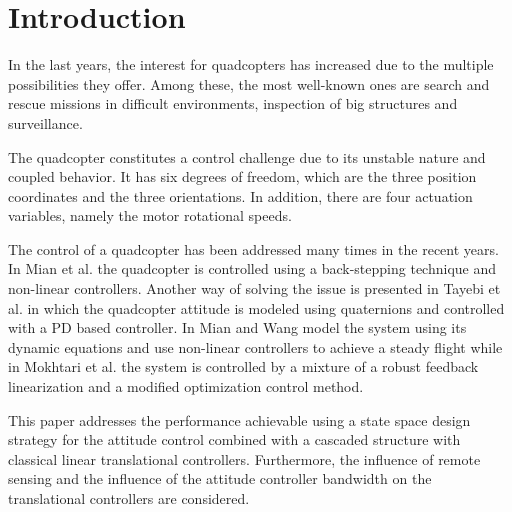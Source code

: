 \section{Introduction}
In the last years, the interest for quadcopters has increased due to the multiple possibilities they offer. Among these, the most well-known ones are search and rescue missions in difficult environments, inspection of big structures and surveillance. \nolinebreak\cite{droneuses}

The quadcopter constitutes a control challenge due to its unstable nature and coupled behavior. It has six degrees of freedom, which are the three position coordinates and the three orientations. In addition, there are four actuation variables, namely the motor rotational speeds. \cite{draganflyer}%

The control of a quadcopter has been addressed many times in the recent years. In Mian et al. \cite{backstepping} the quadcopter is controlled using a back-stepping technique and non-linear controllers. Another way of solving the issue is presented in Tayebi et al. \cite{quaternionsPD} in which the quadcopter attitude is modeled using quaternions and controlled with a PD based controller. In \cite{MianWang} Mian and Wang model the system using its dynamic equations and use non-linear controllers to achieve a steady flight while in Mokhtari et al. \cite{GHinf} the system is controlled by a mixture of a robust feedback linearization and a modified optimization control method.

This paper addresses the performance achievable using a state space design strategy for the attitude control combined with a cascaded structure with classical linear translational controllers. Furthermore, the influence of remote sensing and the influence of the attitude controller bandwidth on the translational controllers are considered.
%


